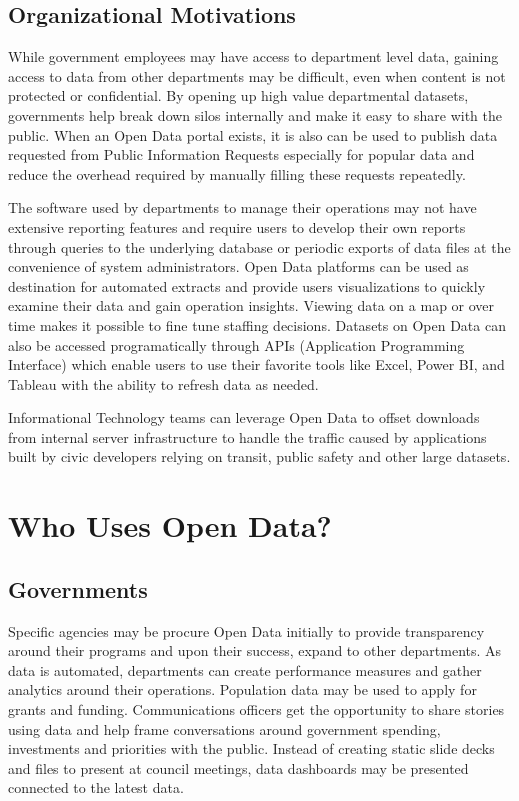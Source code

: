 \documentclass[
  openany]{book}
\begin{document}
\hypertarget{organizational-motivations}{%
\subsection{Organizational Motivations}\label{organizational-motivations}}

While government employees may have access to department level data, gaining access to data from other departments may be difficult, even when content is not protected or confidential. By opening up high value departmental datasets, governments help break down silos internally and make it easy to share with the public. When an Open Data portal exists, it is also can be used to publish data requested from Public Information Requests especially for popular data and reduce the overhead required by manually filling these requests repeatedly.

The software used by departments to manage their operations may not have extensive reporting features and require users to develop their own reports through queries to the underlying database or periodic exports of data files at the convenience of system administrators. Open Data platforms can be used as destination for automated extracts and provide users visualizations to quickly examine their data and gain operation insights. Viewing data on a map or over time makes it possible to fine tune staffing decisions. Datasets on Open Data can also be accessed programatically through APIs (Application Programming Interface) which enable users to use their favorite tools like Excel, Power BI, and Tableau with the ability to refresh data as needed.

Informational Technology teams can leverage Open Data to offset downloads from internal server infrastructure to handle the traffic caused by applications built by civic developers relying on transit, public safety and other large datasets.

\hypertarget{who-uses-open-data}{%
\section{Who Uses Open Data?}\label{who-uses-open-data}}

\hypertarget{governments}{%
\subsection{Governments}\label{governments}}

Specific agencies may be procure Open Data initially to provide transparency around their programs and upon their success, expand to other departments. As data is automated, departments can create performance measures and gather analytics around their operations. Population data may be used to apply for grants and funding. Communications officers get the opportunity to share stories using data and help frame conversations around government spending, investments and priorities with the public. Instead of creating static slide decks and files to present at council meetings, data dashboards may be presented connected to the latest data.
\end{document}
